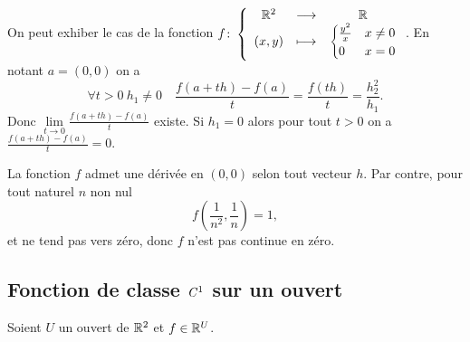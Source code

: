 On peut exhiber le cas de la fonction $f\colon \left\{\begin{array}{ccc} \mathbb{R}^2 & \longrightarrow &\mathbb{R}\\ (x, y) & \longmapsto & \begin{cases} \frac{y^2}{x} & x\neq 0 \\ 0 & x=0 \end{cases} \end{array} \right.$. En notant $a=(0, 0)$ on a
\begin{equation}
  \forall t>0 \ h_1\neq 0 \quad \frac{f(a+th)-f(a)}{t} = \frac{f(th)}{t} = \frac{h_2^2}{h_1}.
\end{equation}
Donc $\lim\limits_{t\to 0} \frac{f(a+th)-f(a)}{t}$ existe. Si $h_1=0$ alors pour tout $t>0$ on a $\frac{f(a+th)-f(a)}{t}=0$.

La fonction $f$ admet une dérivée en $(0, 0)$ selon tout vecteur $h$. Par contre, pour tout naturel $n$ non nul
\begin{equation}
  f\left(\frac{1}{n^2}, \frac{1}{n}\right)=1,
\end{equation}
et ne tend pas vers zéro, donc $f$ n'est pas continue en zéro.

\subsection{Fonction de classe $\mathit{C}^1$ sur un ouvert}

Soient $U$ un ouvert de $\mathbb{R}^2$ et $f \in \mathbb{R}^U$.

